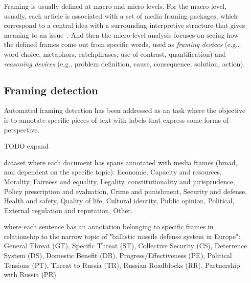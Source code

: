 Framing is usually defined at macro and micro levels.
For the macro-level, usually, each article is associated with a set of media framing packages, which correspond to a central idea with a surrounding interpretive structure that gives meaning to an issue~\cite{gamson1989media}. And then the micro-level analysis focuses on seeing how the defined frames come out from specific words, used as \textit{framing devices} (e.g., word choice, metaphors, catchphrases, use of contrast, quantification) and \textit{reasoning devices} (e.g., problem definition, cause, consequence, solution, action).

\subsection{Framing detection}
\label{ssec:lit_framing_auto}

Automated framing detection has been addressed as an task where the objective is to annotate specific pieces of text with labels that express some forms of perspective.

TODO expand


\cite{card2015media} dataset where each document has spans annotated with media frames (broad, non dependent on the specific topic): Economic, Capacity and resources, Morality, Fairness and equality, Legality, constitutionality and jurisprudence, Policy prescription and evaluation, Crime and punishment, Security and defense, Health and safety, Quality of life, Cultural identity, Public opinion, Political, External regulation and reputation, Other.

\cite{morstatter2018identifying} where each sentence has an annotation belonging to specific frames in relationship to the narrow topic of "ballistic missile defense system in Europe": General Threat (GT), Specific Threat (ST), Collective Security (CS), Deterrence System (DS), Domestic Benefit (DB), Progress/Effectiveness (PE), Political Tensions (PT), Threat to Russia (TR), Russian Roadblocks (RR), Partnership with Russia (PR)




